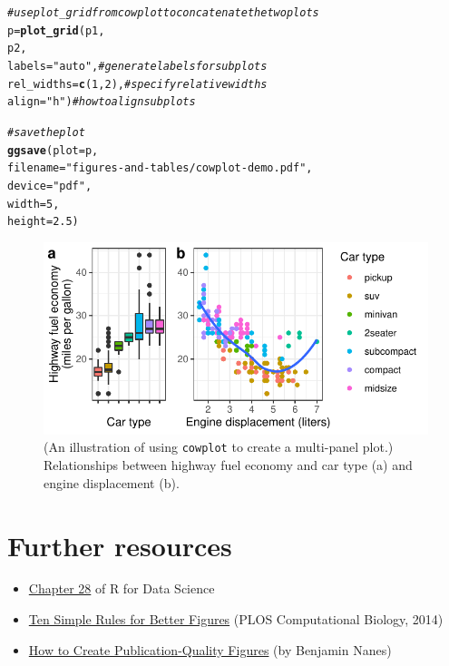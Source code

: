 \documentclass[11pt,letterpaper,english,oneside]{article}\usepackage[]{graphicx}\usepackage[]{xcolor}
\makeatletter
\newcommand{\hlnum}[1]{\textcolor[rgb]{0.686,0.059,0.569}{#1}}%
\newcommand{\hlstr}[1]{\textcolor[rgb]{0.192,0.494,0.8}{#1}}%
\newcommand{\hlcom}[1]{\textcolor[rgb]{0.678,0.584,0.686}{\textit{#1}}}%
\newcommand{\hlstd}[1]{\textcolor[rgb]{0.345,0.345,0.345}{#1}}%
\newcommand{\hlkwb}[1]{\textcolor[rgb]{0.69,0.353,0.396}{#1}}%
\newcommand{\hlkwc}[1]{\textcolor[rgb]{0.333,0.667,0.333}{#1}}%
\newcommand{\hlkwd}[1]{\textcolor[rgb]{0.737,0.353,0.396}{\textbf{#1}}}%
\newenvironment{kframe}{%
 \def\at@end@of@kframe{}%
 \ifinner\ifhmode%
  \def\at@end@of@kframe{\end{minipage}}%
  \begin{minipage}{\columnwidth}%
 \fi\fi%
 \def\FrameCommand##1{\hskip\@totalleftmargin \hskip-\fboxsep
 \colorbox{shadecolor}{##1}\hskip-\fboxsep
     \hskip-\linewidth \hskip-\@totalleftmargin \hskip\columnwidth}%
 \MakeFramed {\advance\hsize-\width
   \@totalleftmargin\z@ \linewidth\hsize
   \@setminipage}}%
 {\par\unskip\endMakeFramed%
 \at@end@of@kframe}
\newenvironment{knitrout}{}{} %
\makeatother
\begin{document}
\begin{knitrout}
\begin{kframe}
\begin{alltt}
\hlcom{# use plot_grid from cowplot to concatenate the two plots}
\hlstd{p} \hlkwb{=} \hlkwd{plot_grid}\hlstd{(p1,}
              \hlstd{p2,}
              \hlkwc{labels} \hlstd{=} \hlstr{"auto"}\hlstd{,}     \hlcom{# generate labels for subplots}
              \hlkwc{rel_widths} \hlstd{=} \hlkwd{c}\hlstd{(}\hlnum{1}\hlstd{,}\hlnum{2}\hlstd{),} \hlcom{# specify relative widths}
              \hlkwc{align} \hlstd{=} \hlstr{"h"}\hlstd{)}         \hlcom{# how to align subplots}

\hlcom{# save the plot}
\hlkwd{ggsave}\hlstd{(}\hlkwc{plot} \hlstd{= p,}
       \hlkwc{filename} \hlstd{=} \hlstr{"figures-and-tables/cowplot-demo.pdf"}\hlstd{,}
       \hlkwc{device} \hlstd{=} \hlstr{"pdf"}\hlstd{,}
       \hlkwc{width} \hlstd{=} \hlnum{5}\hlstd{,}
       \hlkwc{height} \hlstd{=} \hlnum{2.5}\hlstd{)}
\end{alltt}
\end{kframe}
\end{knitrout}
\begin{figure}[!htb]
\centering
\includegraphics{figures-and-tables/cowplot-demo.pdf}
\caption{(An illustration of using \texttt{cowplot} to create a multi-panel plot.) Relationships between highway fuel economy and car type (a) and engine displacement (b). }
\label{fig:cowplot-demo}
\end{figure}

\vspace{2in}

\section{Further resources}

\begin{itemize}
\item \href{https://r4ds.had.co.nz/graphics-for-communication.html}{Chapter 28} of R for Data Science 
\item \href{https://journals.plos.org/ploscompbiol/article?id=10.1371/journal.pcbi.1003833}{Ten Simple Rules for Better Figures} (PLOS Computational Biology, 2014)
\item \href{https://b.nanes.org/figures/}{How to Create Publication-Quality Figures} (by Benjamin Nanes)
\end{itemize}
\end{document}

